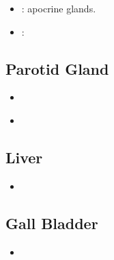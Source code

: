 \begin{itemize}
\begin{multicols}{2}
\begin{itemize}
      \vspace{25pt}

      \begin{center}
      \end{center}

      \item {}: apocrine glands.
      
      \begin{center}
      \end{center}
      
      \item {}: 
      
      \begin{center}
      \end{center}
      
  \end{itemize}
  \end{multicols}

  \subsection{Parotid Gland}\label{Parotid Gland}
  \begin{itemize}
    \item 
  \end{itemize}
  \begin{multicols}{2}
  \begin{itemize}
    \item 
  \end{itemize}
  \end{multicols}
  
  \subsection{Liver}\label{Liver}
  \begin{multicols}{2}
  \begin{itemize}
    \item 
  \end{itemize}
  \end{multicols}
  
  \subsection{Gall Bladder}\label{Gall Bladder}
  \begin{multicols}{2}
  \begin{itemize}
    \item 
  \end{itemize}
  \end{multicols}
  

\end{itemize}
